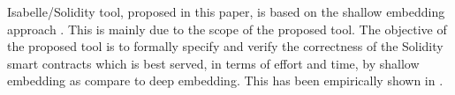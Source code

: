 \documentclass[a4paper,UKenglish,cleveref, autoref, thm-restate]{oasics-v2021}
\begin{document}
Isabelle/Solidity tool, proposed in this paper, is based on the shallow embedding approach \cite{marmsoler2024secure}. 
This is mainly due to the scope of the proposed tool.
% 
The objective of the proposed tool is to formally specify and verify the correctness of the Solidity smart contracts which is best served, in terms of effort and time, by shallow embedding as compare to deep embedding. This has been empirically shown in \cite{marmsoler2024secure}.
%
\end{document}
